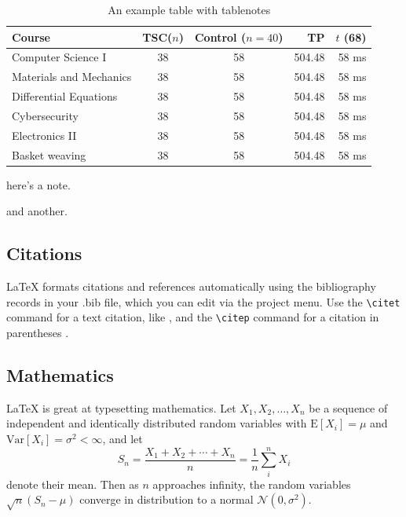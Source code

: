 \documentclass[lineno,10pt]{aseecoed}
\begin{document}
\begin{table}[hbt!]\centering
\begin{threeparttable}
\caption{An example table with tablenotes}\label{tab:withnotes}

\begin{tabular}{lccrr}
\toprule
Course & TSC($n$) & Control ($n=40$) & TP & $t$ (68)\\
\midrule
Computer Science I & 38 & 58\tnote{1} & 504.48 & 58 ms\\
Materials and Mechanics & 38 & 58 & 504.48 & 58 ms\\
Differential Equations & 38 & 58 & 504.48 & 58 ms\\
Cybersecurity & 38 & 58 & 504.48 & 58 ms\\
Electronics II\tnote{2} & 38 & 58 & 504.48 & 58 ms\\
Basket weaving & 38 & 58 & 504.48 & 58 ms\\
\bottomrule
\end{tabular}
\begin{tablenotes}
\item[1] here's a note.
\item[2] and another.
\end{tablenotes}
\end{threeparttable}
\end{table}

\subsection{Citations}

LaTeX formats citations and references automatically using the bibliography records in your .bib file, which you can edit via the project menu. Use the \verb|\citet| command for a text citation, like \citet{borowczak2019mitigating}, and the \verb|\citep| command for a citation in parentheses \citep{burrows2018integrated}.

\subsection{Mathematics}

\LaTeX{} is great at typesetting mathematics. Let $X_1, X_2, \ldots, X_n$ be a sequence of independent and identically distributed random variables with $\text{E}[X_i] = \mu$ and $\text{Var}[X_i] = \sigma^2 < \infty$, and let
\begin{equation}\label{eq:sum}
S_n = \frac{X_1 + X_2 + \cdots + X_n}{n}
      = \frac{1}{n}\sum_{i}^{n} X_i
\end{equation}
denote their mean. Then as $n$ approaches infinity, the random variables $\sqrt{n}(S_n - \mu)$ converge in distribution to a normal $\mathcal{N}(0, \sigma^2)$.
\end{document}
